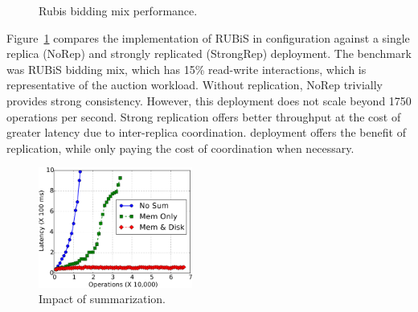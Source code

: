 \begin{figure}[t]
  \centering
	\caption{Rubis bidding mix performance.}
  \label{grf:rubis}
\end{figure}


Figure~\ref{grf:rubis} compares the \quelea implementation of RUBiS in 
configuration against a single replica (NoRep) and strongly replicated
(StrongRep)  deployment. The benchmark was RUBiS bidding mix, which has
15\% read-write interactions, which is representative of the auction workload.
Without replication, NoRep trivially provides strong consistency. However, this
deployment does not scale beyond 1750 operations per second. Strong replication
offers better throughput at the cost of greater latency due to inter-replica
coordination. \quelea deployment offers the benefit of replication, while only
paying the cost of coordination when necessary.

\begin{figure}[t]
\vspace{5mm}
\centering
\includegraphics[width=0.45\textwidth]{graphs/summarization.pdf}
\caption{Impact of summarization.}
\label{grf:summarization}
\end{figure}

